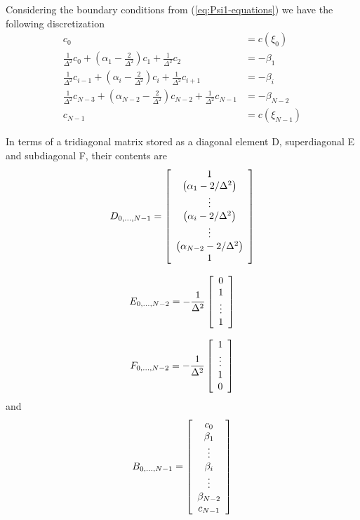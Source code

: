 \documentclass[12pt]{article}%
\begin{document}
Considering the boundary conditions from (\ref{eq:Psi1-equations}) we have the
following discretization%
\begin{align}
c_{0} &  =c(\xi_{0})\\
\frac{1}{\Delta^{2}}c_{0}+\left(  \alpha_{1}-\frac{2}{\Delta^{2}}\right)
c_{1}+\frac{1}{\Delta^{2}}c_{2} &  =-\beta_{1}\\
\frac{1}{\Delta^{2}}c_{i-1}+\left(  \alpha_{i}-\frac{2}{\Delta^{2}}\right)
c_{i}+\frac{1}{\Delta^{2}}c_{i+1} &  =-\beta_{i}\\
\frac{1}{\Delta^{2}}c_{N-3}+\left(  \alpha_{N-2}-\frac{2}{\Delta^{2}}\right)
c_{N-2}+\frac{1}{\Delta^{2}}c_{N-1} &  =-\beta_{N-2}\\
c_{N-1} &  =c\left(  \xi_{N-1}\right)
\end{align}


In terms of a tridiagonal matrix stored as a diagonal element D, superdiagonal
E and subdiagonal F, their contents are%
\begin{equation}
D_{0,\ldots,N-1}=\left[
\begin{array}
[c]{c}%
1\\
\left(  \alpha_{1}-2/\Delta^{2}\right)  \\
\vdots\\
\left(  \alpha_{i}-2/\Delta^{2}\right)  \\
\vdots\\
\left(  \alpha_{N-2}-2/\Delta^{2}\right)  \\
1
\end{array}
\right]  \label{eq:Psi_1--D-vec}%
\end{equation}
%

\begin{equation}
E_{0,\ldots,N-2}=-\frac{1}{\Delta^{2}}\left[
\begin{array}
[c]{c}%
0\\
1\\
\vdots\\
1
\end{array}
\right]  \label{eq:Psi_1--Evec}%
\end{equation}
%

\begin{equation}
F_{0,\ldots,N-2}=-\frac{1}{\Delta^{2}}\left[
\begin{array}
[c]{c}%
1\\
\vdots\\
1\\
0
\end{array}
\right]  \label{eq:Psi_1--Fvec}%
\end{equation}
and%
\begin{equation}
B_{0,\ldots,N-1}=\left[
\begin{array}
[c]{c}%
c_{0}\\
\beta_{1}\\
\vdots\\
\beta_{i}\\
\vdots\\
\beta_{N-2}\\
c_{N-1}%
\end{array}
\right]
\end{equation}
\end{document}
